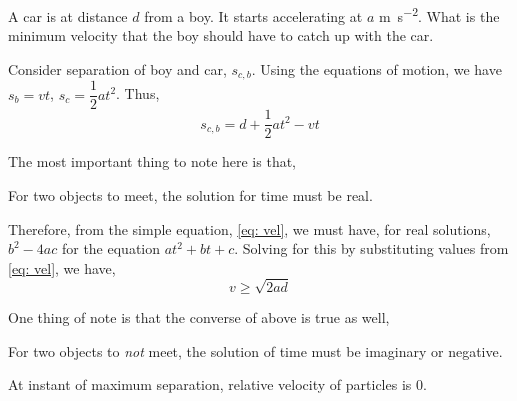 \begin{example}
    A car is at distance \(d\) from a boy. It starts accelerating at \(a\) \si{\metre\per\second\squared}. What is the minimum velocity that the boy should
    have to catch up with the car.
    \begin{soln}
        Consider separation of boy and car, \(s_{c,b}\). Using the equations of motion, 
        we have \(s_{b} = vt\), \(s_{c} = \dfrac{1}{2}at^2\). Thus, 
        \begin{equation}
            \label{eq: vel}
            s_{c,b} = d + \frac{1}{2}at^2 - vt        
        \end{equation}
    
        The most important thing to note here is that, 
        \begin{moral}
            For two objects to meet, the solution for time must be real.
        \end{moral}
        Therefore, from the simple equation, \eqref{eq: vel}, we must have, for real solutions,
        \(b^2 - 4ac\) for the equation \(at^2 + bt + c\). Solving for this by substituting values from
        \eqref{eq: vel}, we have,
            \begin{equation}
                v \ge \sqrt{2ad}
            \end{equation}
    \end{soln}
\end{example}

\begin{remark}
    One thing of note is that the converse of above is true as well,
    \begin{moral}
        For two objects to \emph{not} meet, the solution of time must be imaginary or negative.    
    \end{moral}
\end{remark}


\begin{moral}
    At instant of maximum separation, relative velocity of particles is \(0\).
\end{moral}


